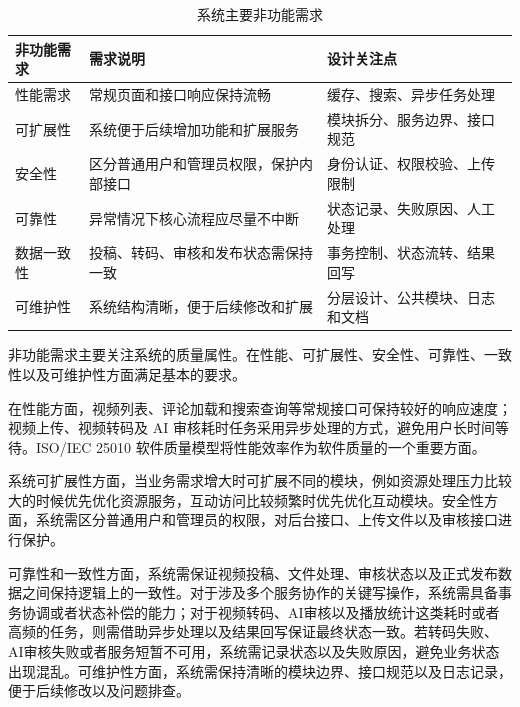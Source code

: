 \begin{table}[htbp]
  \centering
  \caption{系统主要非功能需求}
  \label{tab:non-functional-requirements}
  \begin{tabular}{p{}p{}p{}}
    \hline
    \textbf{非功能需求} & \textbf{需求说明} & \textbf{设计关注点} \\
    \hline
    性能需求 & 常规页面和接口响应保持流畅 & 缓存、搜索、异步任务处理 \\
    可扩展性 & 系统便于后续增加功能和扩展服务 & 模块拆分、服务边界、接口规范 \\
    安全性 & 区分普通用户和管理员权限，保护内部接口 & 身份认证、权限校验、上传限制 \\
    可靠性 & 异常情况下核心流程应尽量不中断 & 状态记录、失败原因、人工处理 \\
    数据一致性 & 投稿、转码、审核和发布状态需保持一致 & 事务控制、状态流转、结果回写 \\
    可维护性 & 系统结构清晰，便于后续修改和扩展 & 分层设计、公共模块、日志和文档 \\
    \hline
  \end{tabular}
\end{table}

非功能需求主要关注系统的质量属性。在性能、可扩展性、安全性、可靠性、一致性以及可维护性方面满足基本的要求。

在性能方面，视频列表、评论加载和搜索查询等常规接口可保持较好的响应速度；视频上传、视频转码及 AI 审核耗时任务采用异步处理的方式，避免用户长时间等待。ISO/IEC 25010 软件质量模型将性能效率作为软件质量的一个重要方面\cite{iso25010}。

系统可扩展性方面，当业务需求增大时可扩展不同的模块，例如资源处理压力比较大的时候优先优化资源服务，互动访问比较频繁时优先优化互动模块。安全性方面，系统需区分普通用户和管理员的权限，对后台接口、上传文件以及审核接口进行保护。

可靠性和一致性方面，系统需保证视频投稿、文件处理、审核状态以及正式发布数据之间保持逻辑上的一致性。对于涉及多个服务协作的关键写操作，系统需具备事务协调或者状态补偿的能力；对于视频转码、AI审核以及播放统计这类耗时或者高频的任务，则需借助异步处理以及结果回写保证最终状态一致。若转码失败、AI审核失败或者服务短暂不可用，系统需记录状态以及失败原因，避免业务状态出现混乱。可维护性方面，系统需保持清晰的模块边界、接口规范以及日志记录，便于后续修改以及问题排查。

